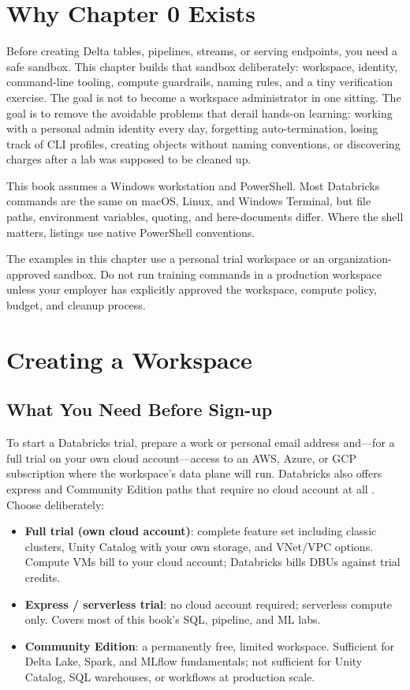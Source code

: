 \section{Why Chapter 0 Exists}
Before creating Delta tables, pipelines, streams, or serving endpoints, you need a safe sandbox. This chapter builds that sandbox deliberately: workspace, identity, command-line tooling, compute guardrails, naming rules, and a tiny verification exercise. The goal is not to become a workspace administrator in one sitting. The goal is to remove the avoidable problems that derail hands-on learning: working with a personal admin identity every day, forgetting auto-termination, losing track of CLI profiles, creating objects without naming conventions, or discovering charges after a lab was supposed to be cleaned up.

This book assumes a Windows workstation and PowerShell. Most Databricks commands are the same on macOS, Linux, and Windows Terminal, but file paths, environment variables, quoting, and here-documents differ. Where the shell matters, listings use native PowerShell conventions.

\begin{notebox}
The examples in this chapter use a personal trial workspace or an organization-approved sandbox. Do not run training commands in a production workspace unless your employer has explicitly approved the workspace, compute policy, budget, and cleanup process.
\end{notebox}

\section{Creating a Workspace}
\subsection{What You Need Before Sign-up}
To start a Databricks trial, prepare a work or personal email address and---for a full trial on your own cloud account---access to an AWS, Azure, or GCP subscription where the workspace's data plane will run. Databricks also offers express and Community Edition paths that require no cloud account at all \cite{databricksTrial}. Choose deliberately:

\begin{itemize}
    \item \textbf{Full trial (own cloud account)}: complete feature set including classic clusters, Unity Catalog with your own storage, and VNet/VPC options. Compute VMs bill to your cloud account; Databricks bills DBUs against trial credits.
    \item \textbf{Express / serverless trial}: no cloud account required; serverless compute only. Covers most of this book's SQL, pipeline, and ML labs.
    \item \textbf{Community Edition}: a permanently free, limited workspace. Sufficient for Delta Lake, Spark, and MLflow fundamentals; not sufficient for Unity Catalog, SQL warehouses, or workflows at production scale.
\end{itemize}

